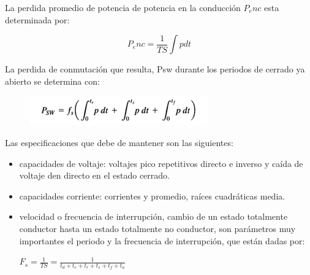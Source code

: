 \documentclass[11pt,a4paper]{article}
\begin{document}
La perdida promedio de potencia de potencia en la conducción $P_enc$ esta determinada por:

\begin{equation}
P_enc= \frac{1}{TS}\int p dt
\end{equation}

La perdida de conmutación que resulta, Psw durante los periodos de cerrado ya abierto se determina con:

\begin{figure}[h]
\begin{center}
\includegraphics[scale=0.4]{5.png}
\end{center}
\end{figure}

Las especificaciones que debe de mantener son las siguientes:

\begin{itemize}
\item capacidades de voltaje: voltajes pico repetitivos directo e inverso y caída de voltaje den directo en el estado cerrado.
\item capacidades corriente: corrientes y promedio, raíces cuadráticas media.
\item velocidad o frecuencia de interrupción, cambio de un estado totalmente conductor hasta un estado totalmente no conductor, son parámetros muy importantes el periodo y la frecuencia de interrupción, que están dadas por:

\begin{center}

$F_s=\frac{1}{TS}=\frac{1}{t_d+t_e+t_r+t_s+t_f+t_a}$
\end{center}

\end{itemize}

\cite{rashid2004electronica}

\newpage




  
\end{document}

